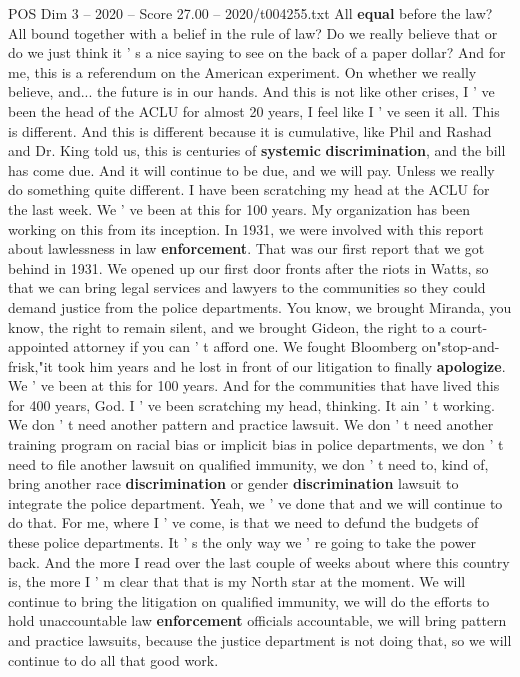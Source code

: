 \begin{textsample}{POS Dim 3 – 2020 – Score 27.00 – 2020/t004255.txt}
All \textbf{equal} before the law?
All bound together with a belief in the rule of law?
Do we really believe that or do we just think it ' s a nice saying to see on the back of a paper dollar?
And for me, this is a referendum on the American experiment.
On whether we really believe, and... the future is in our hands.
And this is not like other crises, I ' ve been the head of the ACLU for almost 20 years, I feel like I ' ve seen it all.
This is different.
And this is different because it is cumulative, like Phil and Rashad and Dr.
King told us, this is centuries of \textbf{systemic} \textbf{discrimination}, and the bill has come due.
And it will continue to be due, and we will pay.
Unless we really do something quite different.
I have been scratching my head at the ACLU for the last week.
We ' ve been at this for 100 years.
My organization has been working on this from its inception.
In 1931, we were involved with this report about lawlessness in law \textbf{enforcement}.
That was our first report that we got behind in 1931.
We opened up our first door fronts after the riots in Watts, so that we can bring legal services and lawyers to the communities so they could demand justice from the police departments.
You know, we brought Miranda, you know, the right to remain silent, and we brought Gideon, the right to a court-appointed attorney if you can ' t afford one.
We fought Bloomberg on"stop-and-frisk,"it took him years and he lost in front of our litigation to finally \textbf{apologize}.
We ' ve been at this for 100 years.
And for the communities that have lived this for 400 years, God.
I ' ve been scratching my head, thinking.
It ain ' t working.
We don ' t need another pattern and practice lawsuit.
We don ' t need another training program on racial bias or implicit bias in police departments, we don ' t need to file another lawsuit on qualified immunity, we don ' t need to, kind of, bring another race \textbf{discrimination} or gender \textbf{discrimination} lawsuit to integrate the police department.
Yeah, we ' ve done that and we will continue to do that.
For me, where I ' ve come, is that we need to defund the budgets of these police departments.
It ' s the only way we ' re going to take the power back.
And the more I read over the last couple of weeks about where this country is, the more I ' m clear that that is my North star at the moment.
We will continue to bring the litigation on qualified immunity, we will do the efforts to hold unaccountable law \textbf{enforcement} officials accountable, we will bring pattern and practice lawsuits, because the justice department is not doing that, so we will continue to do all that good work.

\end{textsample}
